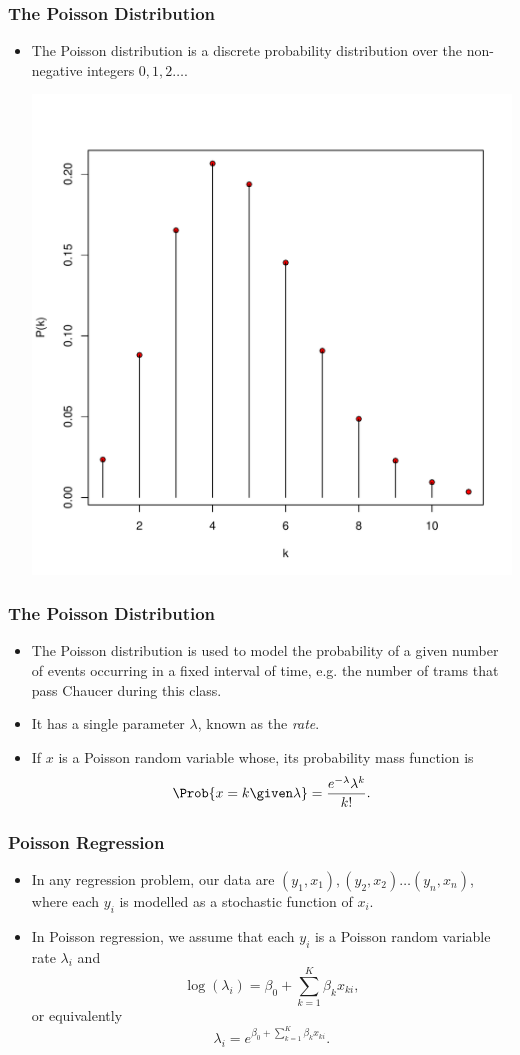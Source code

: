 \documentclass[10pt,xcolor=dvipsnames,serif,professionalfont]{beamer} %
\begin{document}
\begin{frame}
\frametitle{The Poisson Distribution}
\begin{itemize}
\item The Poisson distribution is a discrete probability distribution over the non-negative integers $0,1,2 \ldots$.
\begin{center}
\includegraphics[width=.55\textwidth]{figs/poisson_375.pdf}
\end{center}
%

\end{itemize}
\end{frame}


\begin{frame}
\frametitle{The Poisson Distribution}
\begin{itemize}
\item The Poisson distribution is used to model the probability of a given number of events occurring in a fixed interval of time, e.g. the number of trams that pass Chaucer during this class.
\item It has a single parameter $\lambda$, known as the \emph{rate}.
\item If $x$ is a Poisson random variable whose, its probability mass function is 
\[\Prob{x=k\given \lambda} = \frac{e^{-\lambda}\lambda^k}{k!}.\]
\end{itemize}
\end{frame}
\begin{frame}
\frametitle{Poisson Regression}
\begin{itemize}
\item In any regression problem, our data are $(y_1,x_1), (y_2,x_2) \ldots (y_n,x_n)$, where each $y_i$ is modelled as a stochastic function of $x_i$.
\item In Poisson regression, we assume that each $y_i$ is a Poisson random variable rate $\lambda_i$ and 
\[\log(\lambda_i) = \beta_0 + \sum_{k=1}^K \beta_k x_{ki},\]
or equivalently 
\[\lambda_i = e^{\beta_0 + \sum_{k=1}^K \beta_k x_{ki}}.\]
\end{itemize}
\end{frame}
\end{document}
